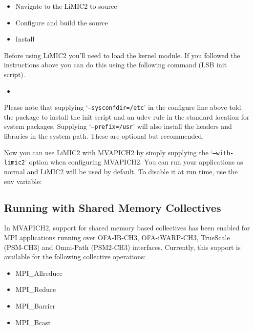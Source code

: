 \begin{itemize}
\item Navigate to the LiMIC2 to source\\

\item Configure and build the source\\

\item Install\\
\end{itemize}

Before using LiMIC2 you'll need to load the kernel module.  If you followed the
instructions above you can do this using the following command (LSB init
script).

\begin{itemize}
\item {}
\end{itemize}

Please note that supplying `\texttt{--sysconfdir=/etc}' in the configure line
above told the package to install the init script and an udev rule in the
standard location for system packages.  Supplying `\texttt{--prefix=/usr}' will
also install the headers and libraries in the system path.  These are optional
but recommended.

Now you can use LiMIC2 with MVAPICH2 by simply supplying the
`\texttt{--with-limic2}' option when configuring MVAPICH2.  You can run your
applications as normal and LiMIC2 will be used by default. To disable it at run time,
use the env variable:


\subsection{Running with Shared Memory Collectives}

In MVAPICH2, support for shared memory based collectives has
been enabled for MPI applications running over OFA-IB-CH3,
OFA-iWARP-CH3, TrueScale (PSM-CH3) and Omni-Path (PSM2-CH3) interfaces.  Currently,
this support is available for the following
collective operations:
\begin{itemize}
		\item{MPI\_Allreduce}
		\item{MPI\_Reduce}
		\item{MPI\_Barrier}
		\item{MPI\_Bcast}
\end{itemize}

